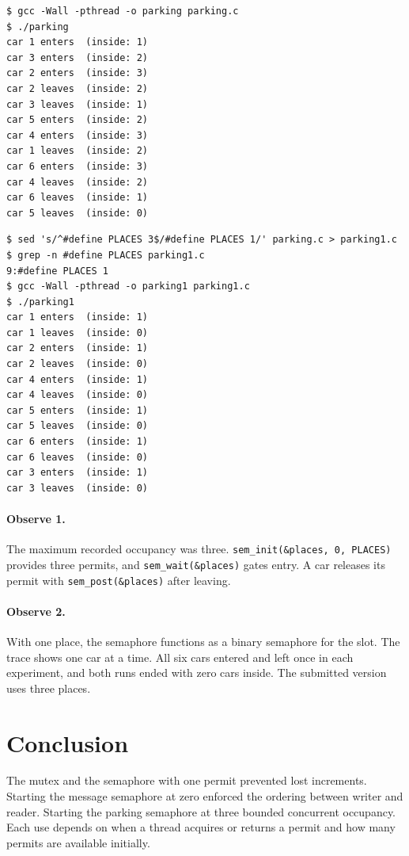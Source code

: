 \documentclass[12pt,a4paper]{article}
\begin{document}
\begin{lstlisting}[caption={Parking with three places}]
$ gcc -Wall -pthread -o parking parking.c
$ ./parking
car 1 enters  (inside: 1)
car 3 enters  (inside: 2)
car 2 enters  (inside: 3)
car 2 leaves  (inside: 2)
car 3 leaves  (inside: 1)
car 5 enters  (inside: 2)
car 4 enters  (inside: 3)
car 1 leaves  (inside: 2)
car 6 enters  (inside: 3)
car 4 leaves  (inside: 2)
car 6 leaves  (inside: 1)
car 5 leaves  (inside: 0)
\end{lstlisting}

\begin{lstlisting}[caption={Parking with one place}]
$ sed 's/^#define PLACES 3$/#define PLACES 1/' parking.c > parking1.c
$ grep -n #define PLACES parking1.c
9:#define PLACES 1
$ gcc -Wall -pthread -o parking1 parking1.c
$ ./parking1
car 1 enters  (inside: 1)
car 1 leaves  (inside: 0)
car 2 enters  (inside: 1)
car 2 leaves  (inside: 0)
car 4 enters  (inside: 1)
car 4 leaves  (inside: 0)
car 5 enters  (inside: 1)
car 5 leaves  (inside: 0)
car 6 enters  (inside: 1)
car 6 leaves  (inside: 0)
car 3 enters  (inside: 1)
car 3 leaves  (inside: 0)
\end{lstlisting}

\paragraph{Observe 1.} The maximum recorded occupancy was three.
\texttt{sem\_init(\&places, 0, PLACES)} provides three permits, and
\texttt{sem\_wait(\&places)} gates entry. A car releases its permit with
\texttt{sem\_post(\&places)} after leaving.

\paragraph{Observe 2.} With one place, the semaphore functions as a binary
semaphore for the slot. The trace shows one car at a time. All six cars entered
and left once in each experiment, and both runs ended with zero cars inside.
The submitted version uses three places.

\section{Conclusion}
The mutex and the semaphore with one permit prevented lost increments. Starting
the message semaphore at zero enforced the ordering between writer and reader.
Starting the parking semaphore at three bounded concurrent occupancy. Each use
depends on when a thread acquires or returns a permit and how many permits are
available initially.
\end{document}
